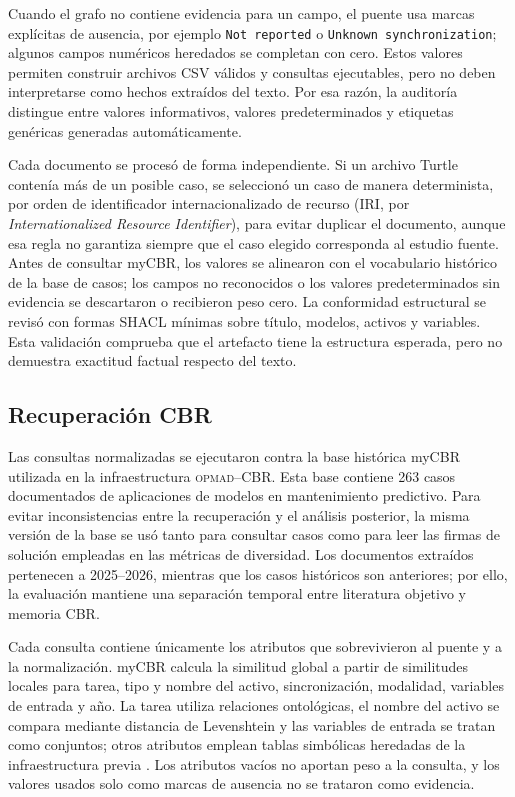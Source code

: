 \documentclass[11pt,a4paper]{article}
\newcommand{\OPMAD}{\textsc{opmad}}
\newcommand{\myCBR}{myCBR}
\begin{document}
Cuando el grafo no contiene evidencia para un campo, el puente usa marcas explícitas de ausencia, por ejemplo \texttt{Not reported} o \texttt{Unknown synchronization}; algunos campos numéricos heredados se completan con cero. Estos valores permiten construir archivos CSV válidos y consultas ejecutables, pero no deben interpretarse como hechos extraídos del texto. Por esa razón, la auditoría distingue entre valores informativos, valores predeterminados y etiquetas genéricas generadas automáticamente.

Cada documento se procesó de forma independiente. Si un archivo Turtle contenía más de un posible caso, se seleccionó un caso de manera determinista, por orden de identificador internacionalizado de recurso (IRI, por \emph{Internationalized Resource Identifier}), para evitar duplicar el documento, aunque esa regla no garantiza siempre que el caso elegido corresponda al estudio fuente. Antes de consultar \myCBR{}, los valores se alinearon con el vocabulario histórico de la base de casos; los campos no reconocidos o los valores predeterminados sin evidencia se descartaron o recibieron peso cero. La conformidad estructural se revisó con formas SHACL mínimas sobre título, modelos, activos y variables. Esta validación comprueba que el artefacto tiene la estructura esperada, pero no demuestra exactitud factual respecto del texto.

\subsection{Recuperación CBR}

Las consultas normalizadas se ejecutaron contra la base histórica \myCBR{} utilizada en la infraestructura \OPMAD{}--CBR. Esta base contiene 263 casos documentados de aplicaciones de modelos en mantenimiento predictivo. Para evitar inconsistencias entre la recuperación y el análisis posterior, la misma versión de la base se usó tanto para consultar casos como para leer las firmas de solución empleadas en las métricas de diversidad. Los documentos extraídos pertenecen a 2025--2026, mientras que los casos históricos son anteriores; por ello, la evaluación mantiene una separación temporal entre literatura objetivo y memoria CBR.

Cada consulta contiene únicamente los atributos que sobrevivieron al puente y a la normalización. \myCBR{} calcula la similitud global a partir de similitudes locales para tarea, tipo y nombre del activo, sincronización, modalidad, variables de entrada y año. La tarea utiliza relaciones ontológicas, el nombre del activo se compara mediante distancia de Levenshtein y las variables de entrada se tratan como conjuntos; otros atributos emplean tablas simbólicas heredadas de la infraestructura previa \citep{Sanchez2012SemanticSimilarity,MonteroJimenez2021OPMADCBR}. Los atributos vacíos no aportan peso a la consulta, y los valores usados solo como marcas de ausencia no se trataron como evidencia.
\end{document}
